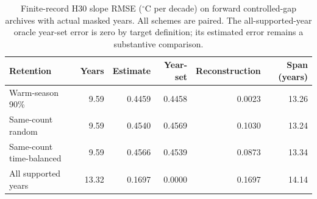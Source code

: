 \begin{table}[t]\centering\small
\caption{Finite-record H30 slope RMSE ($^{\circ}$C per decade) on \PTRTimeN{} forward controlled-gap archives with actual masked years. All schemes are paired. The all-supported-year oracle year-set error is zero by target definition; its estimated error remains a substantive comparison.}
\label{tab:time-support-legacy-weak}
\begin{tabular}{lrrrrr}\toprule
Retention & Years & Estimate & Year-set & Reconstruction & Span (years) \\\midrule
Warm-season 90\% & 9.59 & 0.4459 & 0.4458 & 0.0023 & 13.26 \\
Same-count random & 9.59 & 0.4540 & 0.4569 & 0.1030 & 13.24 \\
Same-count time-balanced & 9.59 & 0.4566 & 0.4539 & 0.0873 & 13.34 \\
All supported years & 13.32 & 0.1697 & 0.0000 & 0.1697 & 14.14 \\
\bottomrule\end{tabular}
\end{table}
